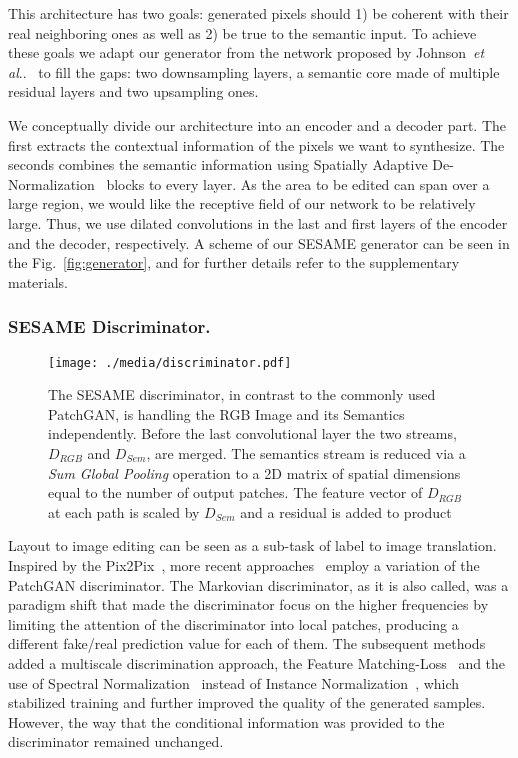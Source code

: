 \documentclass[runningheads]{llncs}
\makeatletter
\DeclareRobustCommand\onedot{\futurelet\@let@token\@onedot}
\def\@onedot{\ifx\@let@token.\else.\null\fi\xspace}
\def\etal{\emph{et al}\onedot}
\newcommand{\fref}[1]{Fig.~\ref{#1}}
\newcommand{\aref}[1]{the supplementary materials}
\makeatother
\begin{document}
This architecture has two goals:  generated pixels should 1) be coherent with their real neighboring ones as well as 2) be true to the semantic input.
To achieve these goals we adapt our generator from the network proposed by Johnson~\etal~\cite{Johnson2016Perceptual} to fill the gaps: two downsampling layers, a semantic core made of multiple  residual layers and two upsampling ones. 

We conceptually divide our architecture into an encoder and a decoder part. The first extracts the contextual information of the pixels we want to synthesize. 
The seconds combines the semantic information using Spatially Adaptive De-Normalization~\cite{park2019SPADE} blocks to every layer. As the area to be edited can span over a large region, we would like the receptive field of our network to be relatively large. Thus, we use dilated convolutions in the last and first layers of the encoder and the decoder, respectively. A scheme of our SESAME generator can be seen in the \fref{fig:generator}, and for further details refer to \aref{}.

\subsubsection{SESAME Discriminator.}
\label{ss:discriminator}

\begin{figure}[t]
\begin{center}
    \centering
    \texttt{[image: ./media/discriminator.pdf]}
    \caption{The SESAME discriminator, in contrast to the commonly used PatchGAN, is handling the RGB Image and its Semantics independently.
    Before the last convolutional layer the two streams, $D_{RGB}$ and $D_{Sem}$, are merged. The semantics stream is reduced via a \textit{Sum Global Pooling} operation to a 2D matrix of spatial dimensions equal to the number of output patches.
    The feature vector of $D_{RGB}$ at each path is scaled by $D_{Sem}$ and a residual is added to product
    }
    \label{fig:discriminator}
\end{center}
\end{figure}
Layout to image editing can be seen as a sub-task of label to image translation.
Inspired by the Pix2Pix~\cite{isola2017image}, more recent approaches~\cite{wang2018pix2pixHD,park2019SPADE} employ a variation of the PatchGAN discriminator.
The Markovian discriminator, as it is also called, was a paradigm shift that made the discriminator focus on the higher frequencies by limiting the attention of the discriminator into local patches, producing a different fake/real prediction value for each of them.
The subsequent methods added a multiscale discrimination approach, the Feature Matching-Loss~\cite{wang2018pix2pixHD} and the use of Spectral Normalization~\cite{miyato2018spectral} instead of Instance Normalization~\cite{park2019SPADE}, which stabilized training and further improved the quality of the generated samples.
However, the way that the conditional information was provided to the discriminator remained unchanged.
\end{document}
